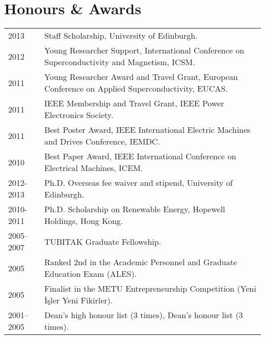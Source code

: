 \documentclass[a4paper,12pt]{article}
\begin{document}
\section{Honours \& Awards}
\begin{tabular}{lp{16cm}}
2013 & Staff Scholarship, University of Edinburgh. \\
2012 & Young Researcher Support, International Conference on Superconductivity and Magnetism, ICSM.\\ 
2011 & Young Researcher Award and Travel Grant, European Conference on Applied Superconductivity, EUCAS. \\ 
2011 & IEEE Membership and Travel Grant, IEEE Power Electronics Society. \\ 
2011 & Best Poster Award, IEEE International Electric Machines and Drives Conference, IEMDC. \\
2010 & Best Paper Award, IEEE International Conference on Electrical Machines, ICEM. \\
2012-2013 & Ph.D. Overseas fee waiver and stipend, University of Edinburgh. \\
2010-2011 & Ph.D. Scholarship on Renewable Energy, Hopewell Holdings, Hong Kong. \\
2005--2007 & TUBITAK Graduate Fellowship. \\
2005 & Ranked 2nd in the Academic Personnel and Graduate Education Exam (ALES).\\
2005 & Finalist in the METU Entrepreneurship Competition (Yeni İşler Yeni Fikirler).\\
2001--2005 & Dean's high honour list (3 times), Dean's honour list (3 times). \\
\end{tabular}
\end{document}
